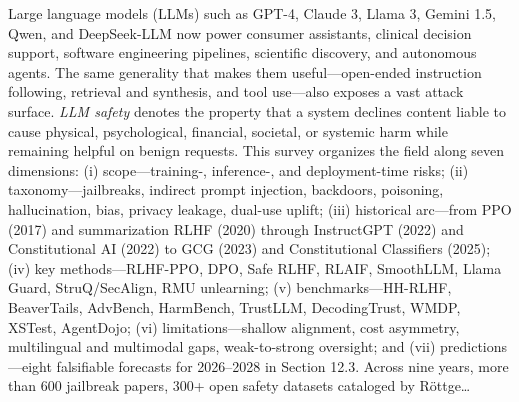 Large language models (LLMs) such as GPT-4, Claude 3, Llama 3, Gemini 1.5, Qwen, and DeepSeek-LLM now power consumer assistants, clinical decision support, software engineering pipelines, scientific discovery, and autonomous agents. The same generality that makes them useful---open-ended instruction following, retrieval and synthesis, and tool use---also exposes a vast attack surface. \emph{LLM safety} denotes the property that a system declines content liable to cause physical, psychological, financial, societal, or systemic harm while remaining helpful on benign requests. This survey organizes the field along seven dimensions: (i) scope---training-, inference-, and deployment-time risks; (ii) taxonomy---jailbreaks, indirect prompt injection, backdoors, poisoning, hallucination, bias, privacy leakage, dual-use uplift; (iii) historical arc---from PPO (2017) and summarization RLHF (2020) through InstructGPT (2022) and Constitutional AI (2022) to GCG (2023) and Constitutional Classifiers (2025); (iv) key methods---RLHF-PPO, DPO, Safe RLHF, RLAIF, SmoothLLM, Llama Guard, StruQ/SecAlign, RMU unlearning; (v) benchmarks---HH-RLHF, BeaverTails, AdvBench, HarmBench, TrustLLM, DecodingTrust, WMDP, XSTest, AgentDojo; (vi) limitations---shallow alignment, cost asymmetry, multilingual and multimodal gaps, weak-to-strong oversight; and (vii) predictions---eight falsifiable forecasts for 2026--2028 in Section 12.3. Across nine years, more than 600 jailbreak papers, 300+ open safety datasets cataloged by Röttge\ldots{}

